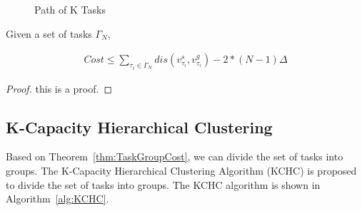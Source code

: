 \documentclass[sigconf,anonymous]{aamas}
\begin{document}
\begin{figure}[ht]
  \centering
  \caption[11]{Path of K Tasks}
  \label{PKT}
\end{figure}

\begin{theorem}
  \label{thm:TaskGroupCost}
  Given a set of tasks $\Gamma_{N}$,
  
  \begin{eqnarray}
    \label{eq:tgc}
        Cost \leq \sum_{\tau_i \in \Gamma_N}{dis(v^{s}_{\tau_i}, v^{g}_{\tau_i})} - 2*(N-1)\Delta
    \end{eqnarray}

\end{theorem}



\begin{proof}
    this is a proof.
\end{proof}

\subsection{K-Capacity Hierarchical Clustering}
Based on Theorem~\ref{thm:TaskGroupCost}, we can divide the set of tasks into groups.
The K-Capacity Hierarchical Clustering Algorithm (KCHC) is proposed to divide the set of tasks into groups.
The KCHC algorithm is shown in Algorithm~\ref{alg:KCHC}.
\end{document}
